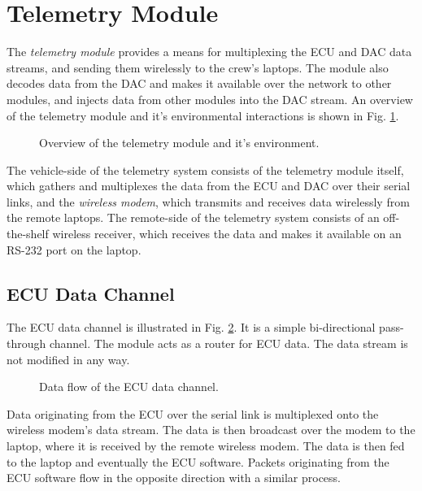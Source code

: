 \section{Telemetry Module\label{sec:Telemetry-Module-Design}}

The \emph{telemetry module} provides a means for multiplexing the ECU and DAC data streams, and sending them wirelessly to the crew's laptops. The module also decodes data from the DAC and makes it available over the network to other modules, and injects data from other modules into the DAC stream. An overview of the telemetry module and it's environmental interactions is shown in Fig. \ref{fig:design_telemetry_overview_block}.

\begin{figure}[H]
	\centering
	
	\caption{Overview of the telemetry module and it's environment.}
	\label{fig:design_telemetry_overview_block}
\end{figure}

The vehicle-side of the telemetry system consists of the telemetry module itself, which gathers and multiplexes the data from the ECU and DAC over their serial links, and the \emph{wireless modem}, which transmits and receives data wirelessly from the remote laptops. The remote-side of the telemetry system consists of an off-the-shelf wireless receiver, which receives the data and makes it available on an RS-232 port on the laptop.

\subsection{ECU Data Channel}

The ECU data channel is illustrated in Fig. \ref{fig:ecu_data_channel}. It is a simple bi-directional pass-through channel. The module acts as a router for ECU data. The data stream is not modified in any way. 

\begin{figure}[H]
	\centering
	
	\caption{Data flow of the ECU data channel.}
	\label{fig:ecu_data_channel}
\end{figure}

Data originating from the ECU over the serial link is multiplexed onto the wireless modem's data stream. The data is then broadcast over the modem to the laptop, where it is received by the remote wireless modem. The data is then fed to the laptop and eventually the ECU software. Packets originating from the ECU software flow in the opposite direction with a similar process.

